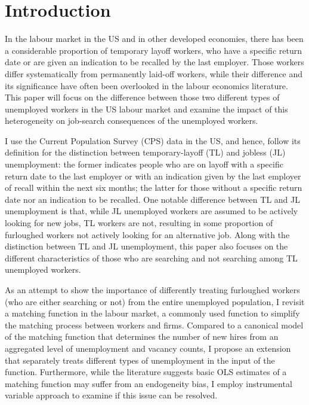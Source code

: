 \documentclass[a4paper, 11pt, tikz]{article}
\begin{document}
\tableofcontents
\listoffigures
\listoftables

\pagebreak \newpage

\onehalfspacing

\section{Introduction}
In the labour market in the US and in other developed economies, there has been a considerable proportion of temporary layoff workers, who have a specific return date or are given an indication to be recalled by the last employer.
Those workers differ systematically from permanently laid-off workers, while their difference and its significance have often been overlooked in the labour economics literature.
This paper will focus on the difference between those two different types of unemployed workers in the US labour market and examine the impact of this heterogeneity on job-search consequences of the unemployed workers.

I use the Current Population Survey (CPS) data in the US, and hence, follow its definition for the distinction between temporary-layoff (TL) and jobless (JL) unemployment: the former indicates people who are on layoff with a specific return date to the last employer or with an indication given by the last employer of recall within the next six months; the latter for those without a specific return date nor an indication to be recalled.
One notable difference between TL and JL unemployment is that, while JL unemployed workers are assumed to be actively looking for new jobs, TL workers are not, resulting in some proportion of furloughed workers not actively looking for an alternative job.
Along with the distinction between TL and JL unemployment, this paper also focuses on the different characteristics of those who are searching and not searching among TL unemployed workers.

As an attempt to show the importance of differently treating furloughed workers (who are either searching or not) from the entire unemployed population, I revisit a matching function in the labour market, a commonly used function to simplify the matching process between workers and firms.
Compared to a canonical model of the matching function that determines the number of new hires from an aggregated level of unemployment and vacancy counts, I propose an extension that separately treats different types of unemployment in the input of the function.
Furthermore, while the literature suggests basic OLS estimates of a matching function may suffer from an endogeneity bias, I employ instrumental variable approach to examine if this issue can be resolved.
\end{document}
